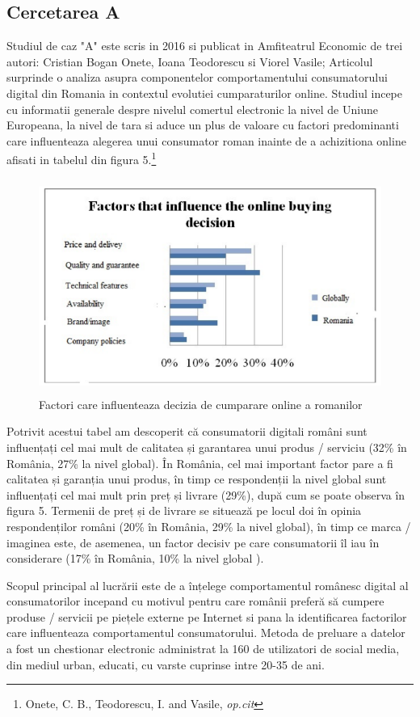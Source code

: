 \documentclass[a4paper, 12pt]{article}
\begin{document}
 \subsection{Cercetarea A}
 Studiul de caz "A" este scris in 2016 si publicat in Amfiteatrul Economic  de trei autori: Cristian Bogan Onete, Ioana Teodorescu si Viorel Vasile; Articolul surprinde o analiza asupra componentelor comportamentului consumatorului digital din Romania in contextul evolutiei cumparaturilor online. Studiul incepe cu informatii generale despre nivelul comertul electronic la nivel de Uniune Europeana, la nivel de tara si aduce un plus de valoare cu  factori predominanti care influenteaza alegerea unui consumator roman inainte de a achizitiona online afisati in tabelul din figura 5.\footnote{Onete, C. B., Teodorescu, I. and Vasile, \textit{op.cit}}
 	\begin{figure}[!htb]
 	\centering
 	\includegraphics[width=12cm, height=7cm]{"figures/fifth.png"}
 	\caption{Factori care influenteaza decizia de cumparare online a romanilor}\label{fig:fifth}
 \end{figure}

		\quad  Potrivit acestui tabel am descoperit că consumatorii digitali români sunt influențați cel mai mult de calitatea și garantarea unui produs / serviciu (32\% în România, 27\% la nivel global). În România, cel mai important factor pare a fi calitatea și garanția unui produs, în timp ce respondenții la nivel global sunt influențați cel mai mult prin preț și livrare (29\%), după cum se poate observa în figura 5. Termenii de preț și de livrare se situează pe locul doi în opinia respondenților români (20\% în România, 29\% la nivel global), în timp ce marca / imaginea este, de asemenea, un factor decisiv pe care consumatorii îl iau în considerare (17\% în România, 10\% la nivel global ).
		
		\quad Scopul principal al lucrării este de a înțelege comportamentul românesc digital al consumatorilor incepand cu motivul pentru care românii preferă să cumpere produse / servicii pe piețele externe pe Internet si pana la identificarea factorilor care influenteaza comportamentul consumatorului. Metoda de preluare a datelor a fost un chestionar electronic administrat la 160 de utilizatori de social media, din mediul urban, educati, cu varste cuprinse intre 20-35 de ani.
		
\end{document}
